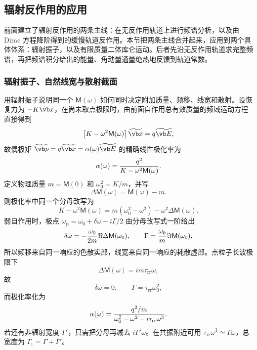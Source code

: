 \subsection{辐射反作用的应用}

前面建立了辐射反作用的两条主线：在无反作用轨道上进行频谱分析，以及由 Dirac 方程降阶得到的缓慢轨道反作用。本节把两条主线合并起来，应用到两个具体体系：辐射振子，以及有限质量二体库仑运动。后者先沿无反作用轨道求完整频谱，再把频谱积分给出的能量、角动量通量绝热地反馈到轨道常数。

\subsubsection{辐射振子、自然线宽与散射截面}

用辐射振子说明同一个 $\mathsf M(\omega)$ 如何同时决定附加质量、频移、线宽和散射。设恢复力为 $-K\vb x$，在尚未取点极限时，由前面自作用总有效质量的频域运动方程直接得到
\begin{equation*}
	\left[K-\omega^2\mathsf M(\omega)\right]\widetilde{\vb x}
	=q\widetilde{\vb E},
\end{equation*}
故偶极矩 $\widetilde{\vb p}=q\widetilde{\vb x}=\alpha(\omega)\widetilde{\vb E}$ 的精确线性极化率为
\begin{equation*}
	\alpha(\omega)
	={q^2\over K-\omega^2\mathsf M(\omega)}.
\end{equation*}
定义物理质量 $m=\mathsf M(0)$ 和 $\omega_0^2=K/m$，并写
\begin{equation*}
	\Delta\mathsf M(\omega)=\mathsf M(\omega)-m.
\end{equation*}
则极化率中同一个分母改写为
\begin{equation*}
	K-\omega^2\mathsf M(\omega)
	=m(\omega_0^2-\omega^2)-\omega^2\Delta\mathsf M(\omega).
\end{equation*}
弱自作用时，极点 $\omega_{\mathrm p}=\omega_0+\delta\omega-i\Gamma/2$ 由分母改写式一阶给出
\begin{equation*}
	\delta\omega
	=-{\omega_0\over2m}\Re\Delta\mathsf M(\omega_0),
	\qquad
	\Gamma
	={\omega_0\over m}\Im\mathsf M(\omega_0).
\end{equation*}
所以频移来自同一响应的色散实部，线宽来自同一响应的耗散虚部。点粒子长波极限下
\begin{equation*}
	\Delta\mathsf M(\omega)=im\tau_{\mathrm{rr}}\omega,
\end{equation*}
故
\begin{equation*}
	\delta\omega=0,
	\qquad
	\Gamma=\tau_{\mathrm{rr}}\omega_0^2,
\end{equation*}
而极化率化为
\begin{equation*}
	\alpha(\omega)
	={q^2/m\over\omega_0^2-\omega^2-i\tau_{\mathrm{rr}}\omega^3}.
\end{equation*}
若还有非辐射宽度 $\Gamma'$，只需把分母再减去 $i\Gamma'\omega$。在共振附近可用 $\tau_{\mathrm{rr}}\omega^3\simeq\Gamma\omega$，总宽度为 $\Gamma_{\mathrm t}=\Gamma+\Gamma'$。

